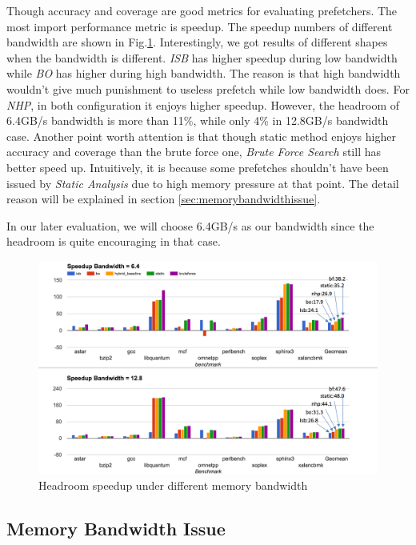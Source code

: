   Though accuracy and coverage are good metrics for evaluating prefetchers. The most import performance metric is speedup. The speedup numbers of different bandwidth are shown in Fig.\ref{fig:headroom_speedup}. Interestingly, we got results of different shapes when the bandwidth is different. \emph{ISB} has higher speedup during low bandwidth while \emph{BO} has higher during high bandwidth. The reason is that high bandwidth wouldn't give much punishment to useless prefetch while low bandwidth does. For \emph{NHP}, in both configuration it enjoys higher speedup. However, the headroom of 6.4GB/s bandwidth is more than 11\%, while only 4\% in 12.8GB/s bandwidth case. Another point worth attention is that though static method enjoys higher accuracy and coverage than the brute force one, \emph{Brute Force Search} still has better speed up. Intuitively, it is because some prefetches shouldn't have been issued by \emph{Static Analysis} due to high memory pressure at that point. The detail reason will be explained in section \ref{sec:memorybandwidthissue}.

  In our later evaluation, we will choose 6.4GB/s as our bandwidth since the headroom is quite encouraging in that case.


  \begin{figure}[ht!]
	   \centering
	   \includegraphics[width=1.0\textwidth]{images/headroom_speedup.png}
	   \caption{Headroom speedup under different memory bandwidth}
	  \label{fig:headroom_speedup}
  \end{figure}

  \subsection{Memory Bandwidth Issue}

